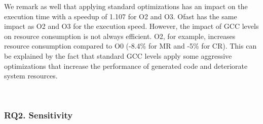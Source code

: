 We remark as well that applying standard optimizations has an impact on the execution time with a speedup of 1.107 for O2 and O3. Ofast has the same impact as O2 and O3 for the execution speed. However, the impact of GCC levels on resource consumption is not always efficient. O2, for example, increases resource consumption compared to O0 (-8.4\% for MR and -5\% for CR). This can be explained by the fact that standard GCC levels apply some aggressive optimizations that increase the performance of generated code and deteriorate system resources.  
 	



\noindent{}
\\
\subsubsection{RQ2. Sensitivity}
